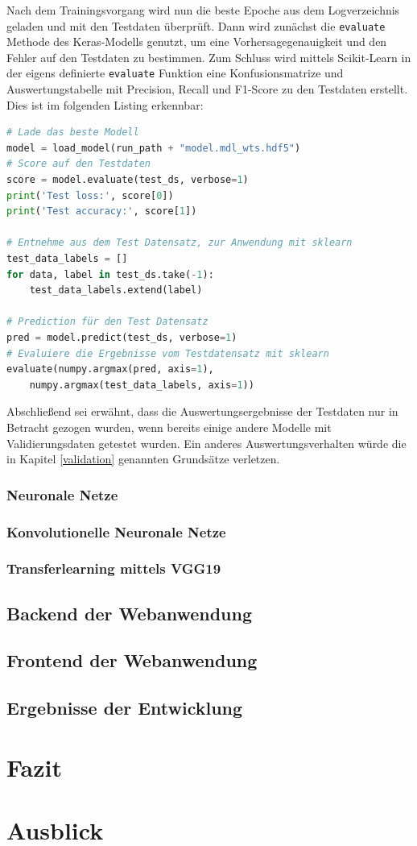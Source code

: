 \documentclass[11pt,bibliography=totocnumbered]{scrartcl}
\begin{document}
Nach dem Trainingsvorgang wird nun die beste Epoche aus dem Logverzeichnis geladen und mit den Testdaten überprüft. Dann wird zunächst die \lstinline[language=pythoninline]|evaluate| Methode des Keras-Modells genutzt, um eine Vorhersagegenauigkeit und den Fehler auf den Testdaten zu bestimmen. Zum Schluss wird mittels Scikit-Learn in der eigens definierte \lstinline[language=pythoninline]|evaluate| Funktion eine Konfusionsmatrize und Auswertungstabelle mit Precision, Recall und F1-Score zu den Testdaten erstellt. Dies ist im folgenden Listing erkennbar:
\begin{lstlisting}[language=python,firstnumber=1,caption={Auswertung eines Modells mit Testdaten},label=lst:modell_eval]
# Lade das beste Modell
model = load_model(run_path + "model.mdl_wts.hdf5")
# Score auf den Testdaten
score = model.evaluate(test_ds, verbose=1)
print('Test loss:', score[0])
print('Test accuracy:', score[1])

# Entnehme aus dem Test Datensatz, zur Anwendung mit sklearn
test_data_labels = []
for data, label in test_ds.take(-1):
	test_data_labels.extend(label)

# Prediction für den Test Datensatz
pred = model.predict(test_ds, verbose=1)
# Evaluiere die Ergebnisse vom Testdatensatz mit sklearn
evaluate(numpy.argmax(pred, axis=1), 
	numpy.argmax(test_data_labels, axis=1))
\end{lstlisting}
Abschließend sei erwähnt, dass die Auswertungsergebnisse der Testdaten nur in Betracht gezogen wurden, wenn bereits einige andere Modelle mit Validierungsdaten getestet wurden. Ein anderes Auswertungsverhalten würde die in Kapitel \ref{validation} genannten Grundsätze verletzen.
\subsubsection{Neuronale Netze}
\subsubsection{Konvolutionelle Neuronale Netze}
\subsubsection{Transferlearning mittels VGG19}
\subsection{Backend der Webanwendung}
\subsection{Frontend der Webanwendung}
\subsection{Ergebnisse der Entwicklung}
\section{Fazit} 
\section{Ausblick}
\setcounter{biburllcpenalty}{7000}
\setcounter{biburlucpenalty}{8000}
\pagebreak
\printbibliography[title=Quellen]
\end{document}
